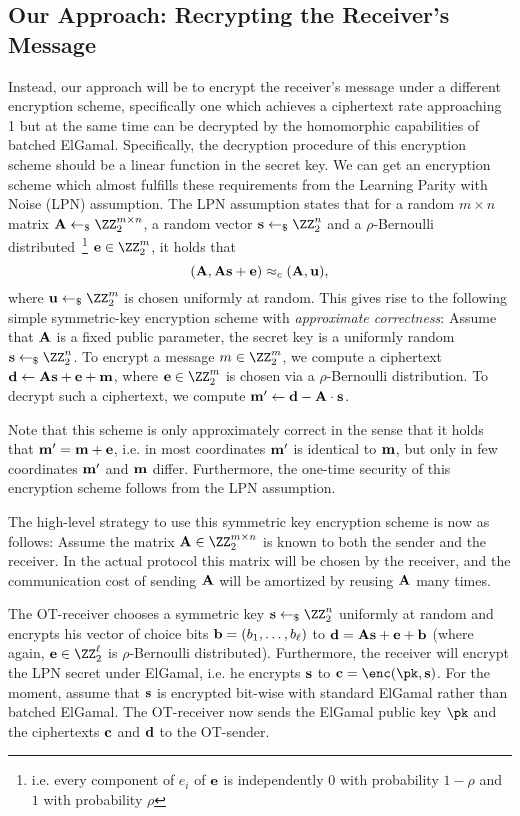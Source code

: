 \subsection{Our Approach: Recrypting the Receiver's Message}

Instead, our approach will be to encrypt the receiver's message under a different encryption scheme, specifically one which achieves a ciphertext rate approaching 1 but at the same time can be decrypted by the homomorphic capabilities of batched ElGamal. Specifically, the decryption procedure of this encryption scheme should be a linear function in the secret key. We can get an encryption scheme which almost fulfills these requirements from the Learning Parity with Noise (LPN) assumption. The LPN assumption states that for a random $m \times n$ matrix $\vc{A} \pick \ZZ_2^{m \times n}$, a random vector $\vc{s} \pick \ZZ_2^n$ and a $\rho$-Bernoulli distributed~\footnote{i.e. every component of $e_i$ of $\mathbf{e}$ is independently $0$ with probability $1 - \rho$ and $1$ with probability $\rho$} $\vc{e} \in \ZZ_2^m$, it holds that
\[
(\mathbf{A},\mathbf{A}\mathbf{s} + \mathbf{e}) \approx_c (\mathbf{A},\mathbf{u}),
\]
where $\vc{u} \pick \ZZ_2^m$ is chosen uniformly at random. This gives rise to the following simple symmetric-key encryption scheme with \emph{approximate correctness}: Assume that $\mathbf{A}$ is a fixed public parameter, the secret key is a uniformly random $\vc{s} \pick \ZZ_2^n$. To encrypt a message $m \in \ZZ_2^m$, we compute a ciphertext $\mathbf{d} \gets \mathbf{A}\mathbf{s} + \mathbf{e} + \mathbf{m}$, where $\vc{e} \in \ZZ_2^m$ is chosen via a $\rho$-Bernoulli distribution. To decrypt such a ciphertext, we compute $\mathbf{m}' \gets \mathbf{d} - \mathbf{A}\cdot \mathbf{s}$.

Note that this scheme is only approximately correct in the sense that it holds that $\mathbf{m}' = \mathbf{m} + \mathbf{e}$, i.e. in most coordinates $\mathbf{m}'$ is identical to $\mathbf{m}$, but only in few coordinates $\mathbf{m}'$ and $\mathbf{m}$ differ. Furthermore, the one-time security of this encryption scheme follows from the LPN assumption.

The high-level strategy to use this symmetric key encryption scheme is now as follows: Assume the matrix $\vc{A} \in \ZZ_2^{m \times n}$ is known to both the sender and the receiver. In the actual protocol this matrix will be chosen by the receiver, and the communication cost of sending $\mathbf{A}$ will be amortized by reusing $\mathbf{A}$ many times.

The OT-receiver chooses a symmetric key $\vc{s} \pick \ZZ_2^n$ uniformly at random and encrypts his vector of choice bits $\mathbf{b} = (b_1,\dots,b_\ell)$ to $\mathbf{d} = \mathbf{A}\mathbf{s} + \mathbf{e} + \mathbf{b}$ (where again, $\vc{e} \in \ZZ_2^\ell$ is $\rho$-Bernoulli distributed). Furthermore, the receiver will encrypt the LPN secret under ElGamal, i.e. he encrypts $\mathbf{s}$ to $\vc{c} = \enc(\pk,\vc{s})$. For the moment, assume that $\mathbf{s}$ is encrypted bit-wise with standard ElGamal rather than batched ElGamal. The OT-receiver now sends the ElGamal public key $\pk$ and the ciphertexts $\mathbf{c}$ and $\mathbf{d}$ to the OT-sender.


